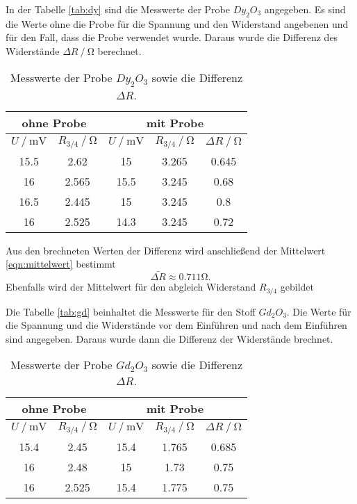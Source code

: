 In der Tabelle \eqref{tab:dy} sind die Messwerte der Probe $Dy_2O_3$ angegeben. Es sind die 
Werte ohne die Probe für die Spannung und den Widerstand angebenen und für den Fall, dass die Probe
verwendet wurde. Daraus wurde die Differenz des Widerstände $\Delta R\mathbin{/}\si{\ohm}$ berechnet.

\begin{table}
  \centering
  \caption{Messwerte der Probe $Dy_2O_3$ sowie die Differenz $\Delta R$.}
  \label{tab:dy}
\begin{tabular}{c c | c c | c}
  \hline
  \multicolumn{2}{c}{ohne Probe} & \multicolumn{3}{c}{mit Probe} \\
  \hline
  $U\mathbin{/} \si{\mV}$ & $R_{3/4}\mathbin{/} \si{\ohm}$ & $U\mathbin{/} \si{\mV}$ & $R_{3/4}\mathbin{/} \si{\ohm}$ & $\Delta R\mathbin{/}\si{\ohm}$ \\
  \hline
  15.5  & 2.62 & 15    & 3.265 & 0.645\\
  16  & 2.565 & 15.5   & 3.245 & 0.68\\
  16.5 & 2.445 & 15   & 3.245 & 0.8\\
  16  & 2.525 & 14.3   & 3.245 & 0.72\\
  \bottomrule
  \end{tabular}
\end{table}

Aus den brechneten Werten der Differenz wird anschließend der Mittelwert \eqref{eqn:mittelwert} bestimmt
\begin{equation*}
  \bar{\Delta R} \approx 0.711 \si{\ohm}.
\end{equation*}
Ebenfalls wird der Mittelwert für den abgleich Widerstand $R_{3/4}$ gebildet

Die Tabelle \eqref{tab:gd} beinhaltet die Messwerte für den Stoff $Gd_2O_3$. Die Werte für die Spannung und die Widerstände
vor dem Einführen und nach dem Einführen sind angegeben. Daraus wurde dann die Differenz der Widerstände brechnet. 
\begin{table}
  \centering
  \caption{Messwerte der Probe $Gd_2O_3$ sowie die Differenz $\Delta R$.}
  \label{tab:gd}
\begin{tabular}{c c | c c | c}
  \hline
  \multicolumn{2}{c}{ohne Probe} & \multicolumn{3}{c}{mit Probe} \\
  \hline
  $U\mathbin{/} \si{\mV}$ & $R_{3/4}\mathbin{/} \si{\ohm}$ & $U\mathbin{/} \si{\mV}$ & $R_{3/4}\mathbin{/} \si{\ohm}$ & $\Delta R\mathbin{/}\si{\ohm}$ \\
  \hline
  15.4 & 2.45 & 15.4  & 1.765 & 0.685\\
  16  & 2.48 & 15  & 1.73 & 0.75\\
  16 & 2.525& 15.4  & 1.775 & 0.75\\
  \bottomrule
  \end{tabular}
\end{table}


